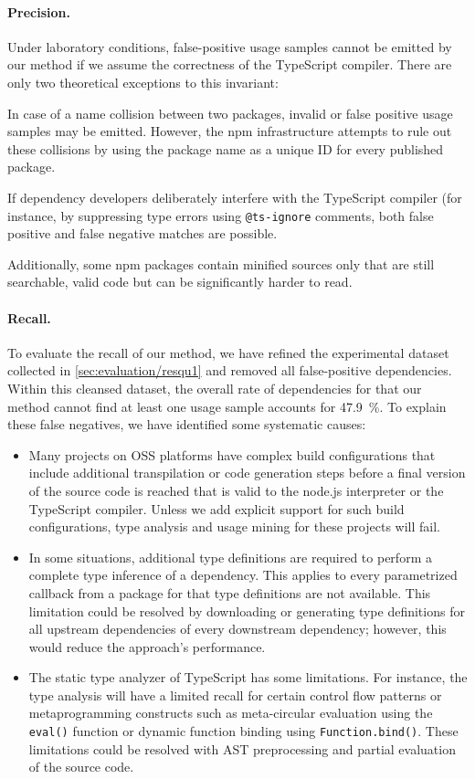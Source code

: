 \documentclass[a4paper,twoside]{article}
\begin{document}
\paragraph{Precision.}
%
Under laboratory conditions, false-positive usage samples cannot be emitted by our method if we assume the correctness of the TypeScript compiler.
There are only two theoretical exceptions to this invariant:
%
\begin{enumerate*}[label=(\roman*)]
	\item In case of a name collision between two packages, invalid or false positive usage samples may be emitted.
        However, the npm infrastructure attempts to rule out these collisions by using the package name as a unique ID for every published package.
	\item If dependency developers deliberately interfere with the TypeScript compiler (for instance,
	    by suppressing type errors using \texttt{@ts-ignore} comments, both false positive and false negative matches are possible.
\end{enumerate*}
%
Additionally, some npm packages contain minified sources only that are still searchable, valid code but can be significantly harder to read.

\paragraph{Recall.}
%
To evaluate the recall of our method, we have refined the experimental dataset collected in \cref{sec:evaluation/resqu1} and removed all false-positive dependencies.
Within this cleansed dataset, the overall rate of dependencies for that our method cannot find at least one usage sample accounts for \SI{47.9}{\percent}.
To explain these false negatives, we have identified some systematic causes:
%
\begin{itemize}
	\item Many projects on OSS platforms have complex build configurations that include additional transpilation or code generation steps before a final version of the source code is reached that is valid to the node.js interpreter or the TypeScript compiler.
		Unless we add explicit support for such build configurations, type analysis and usage mining for these projects will fail.
	\item In some situations, additional type definitions are required to perform a complete type inference of a dependency.
		This applies to every parametrized callback from a package for that type definitions are not available.
		This limitation could be resolved by downloading or generating type definitions for all upstream dependencies of every downstream dependency; however, this would reduce the approach's performance.
	\item The static type analyzer of TypeScript has some limitations.
		For instance, the type analysis will have a limited recall for certain control flow patterns or metaprogramming constructs such as meta-circular evaluation using the \texttt{eval()} function or dynamic function binding using \texttt{Function.bind()}.
		These limitations could be resolved with AST preprocessing and partial evaluation of the source code.
\end{itemize}
\end{document}
